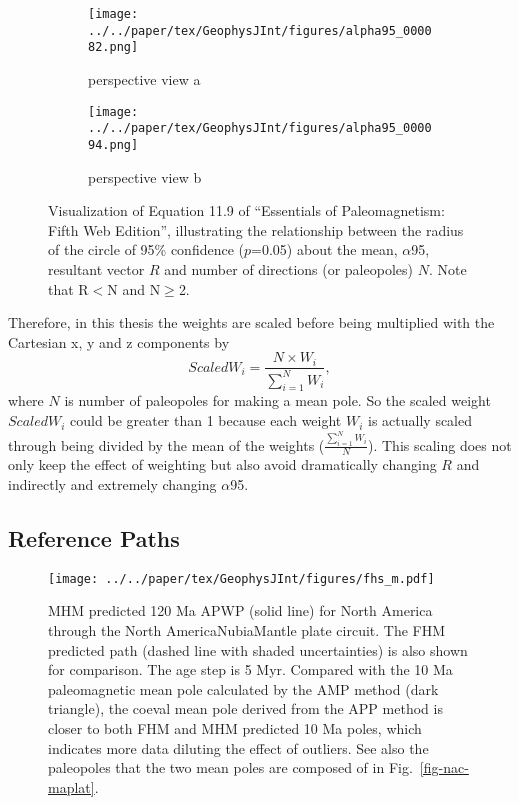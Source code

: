 \begin{figure*}
  \centering
  \begin{subfigure}{.49\textwidth}
    \texttt{[image: ../../paper/tex/GeophysJInt/figures/alpha95\_000082.png]}
    \caption{perspective view a}
  \end{subfigure}
  \begin{subfigure}{.49\textwidth}
    \texttt{[image: ../../paper/tex/GeophysJInt/figures/alpha95\_000094.png]}
    \caption{perspective view b}
  \end{subfigure}
  \caption[Visualization of the equation used to estimate $\alpha$95 from R and
    N]{Visualization of Equation 11.9 of ``Essentials of Paleomagnetism: Fifth
    Web Edition'', illustrating the relationship between the radius of the
    circle of 95\% confidence ($p$=0.05) about the mean, $\alpha$95, resultant
    vector $R$ and number of directions (or paleopoles) $N$. Note that R$<$N and
    N$\geq$2.}\label{fig-alpha95}
\end{figure*}

Therefore, in this thesis the weights are scaled before being multiplied with
the Cartesian x, y and z components by
%
\begin{equation*}
  ScaledW_i=\frac{N \times W_i}{\sum\limits_{i=1}^{N} W_i},
\end{equation*}
%
where $N$ is number of paleopoles for making a mean pole. So the scaled weight
$ScaledW_i$ could be greater than 1 because each weight $W_i$ is actually scaled
through being divided by the mean of the weights ($\frac{\sum\limits_{i=1}^{N}
W_i}{N}$). This scaling does not only keep the effect of weighting but also
avoid dramatically changing $R$ and indirectly and extremely changing
$\alpha$95.

\subsection{Reference Paths}\label{sec:refpath}

\begin{figure}[!ht]
  \centering
  \texttt{[image: ../../paper/tex/GeophysJInt/figures/fhs\_m.pdf]}
  \caption[120 Ma MHM vs FHM predicted APWP of North America]{MHM
    predicted 120 Ma APWP (solid line) for North America through the
    North America\textendash{}Nubia\textendash{}Mantle plate circuit. The FHM
    predicted path (dashed line with shaded uncertainties) is also shown for
    comparison. The age step is 5 Myr. Compared with the 10 Ma paleomagnetic
    mean pole calculated by the AMP method (dark triangle), the coeval mean pole
    derived from the APP method is closer to both FHM and MHM predicted 10 Ma
    poles, which indicates more data diluting the effect of outliers. See also
    the paleopoles that the two mean poles are composed of in
    Fig.~\ref{fig-nac-maplat}.}\label{fig-mhsPred}
\end{figure}

